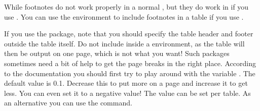 While footnotes do not work properly in a
normal , but they do work in 
if you use .
You can use the  environment to include footnotes in a table
if you use .

If you use the  package, 
note that you should specify the table header and footer outside the table itself.
Do not include  inside a  environment, as the table will
then be output on one page, which is not what you want!
Such packages sometimes need a bit of help to get the page breaks in the right place.
According to the  documentation you should first try to play
around with the variable . The default value is \num{0.1}.
Decrease this to put more on a page and increase it to get less.
You can even set it to a negative value!
The value can be set per table.
As an alternative you can use the  command.

